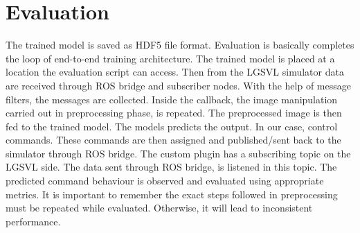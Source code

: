 \section{Evaluation}
The trained model is saved as HDF5 file format. Evaluation is basically completes the loop
of end-to-end training architecture. The trained model is placed at a location the
evaluation script can access. Then from the LGSVL simulator data are received through ROS
bridge and subscriber nodes. With the help of message filters, the messages are collected.
Inside the callback, the image manipulation carried out in preprocessing phase, is
repeated. The preprocessed image is then fed to the trained model. The models predicts the
output. In our case, control commands. These commands are then assigned and published/sent
back to the simulator through ROS bridge. The custom plugin has a subscribing topic on the
LGSVL side. The data sent through ROS bridge, is listened in this topic. The predicted command behaviour is observed and
evaluated using appropriate metrics. It is important to remember the exact steps followed
in preprocessing must be repeated while evaluated. Otherwise, it will lead to inconsistent
performance.

